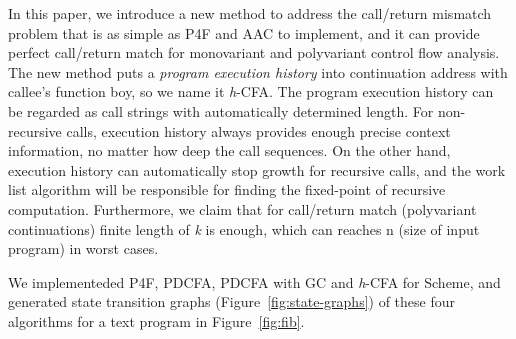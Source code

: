 \documentclass{article}
\begin{document}
In this paper, we introduce a new method to address the call/return mismatch problem that is as simple as P4F and AAC to implement, and it can provide perfect call/return match for monovariant and polyvariant control flow analysis. The new method puts a \emph{program execution history} into continuation address with callee's function boy, so we name it \textit{h}-CFA\@. The program execution history can be regarded as call strings with automatically determined length. For non-recursive calls, execution history always provides enough precise context information, no matter how deep the call sequences. On the other hand, execution history can automatically stop growth for recursive calls, and the work list algorithm will be responsible for finding the fixed-point of recursive computation. Furthermore, we claim that for call/return match (polyvariant continuations) finite length of \textit{k} is enough, which can reaches n (size of input program) in worst cases.

We implementeded P4F, PDCFA, PDCFA with GC and \textit{h}-CFA for Scheme, and generated state transition graphs (Figure~\ref{fig:state-graphs}) of these four algorithms for a text program in Figure~\ref{fig:fib}.
\end{document}
